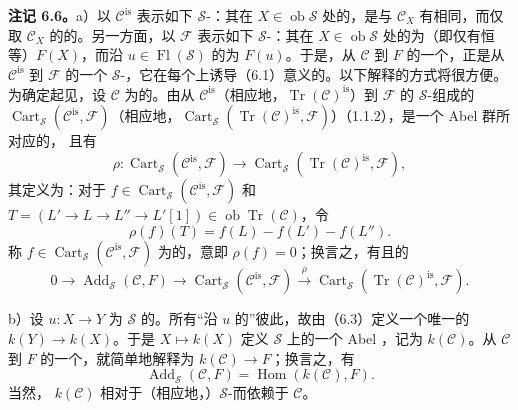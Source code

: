 \textbf{注记 6.6。}a）以 $\mathcal C^{\mathrm{is}}$ 表示如下 $\mathscr S$-：其在 $X\in\operatorname{ob}\mathscr S$ 处的，是与 $\mathcal C_X$ 有相同，而仅取 $\mathcal C_X$ 的的。另一方面，以 $\mathcal F$ 表示如下 $\mathscr S$-：其在 $X\in\operatorname{ob}\mathscr S$ 处的为（即仅有恒等）$F(X)$，而沿 $u\in\operatorname{Fl}(\mathscr S)$ 的为 $F(u)$。于是，从 $\mathcal C$ 到 $F$ 的一个，正是从 $\mathcal C^{\mathrm{is}}$ 到 $\mathcal F$ 的一个 $\mathscr S$-，它在每个上诱导（6.1）意义的。以下解释的方式将很方便。为确定起见，设 $\mathcal C$ 为的。由从 $\mathcal C^{\mathrm{is}}$（相应地，$\operatorname{Tr}(\mathcal C)^{\mathrm{is}}$）到 $\mathcal F$ 的 $\mathscr S$-组成的
$\operatorname{Cart}_{\mathscr S}(\mathcal C^{\mathrm{is}},\mathcal F)$（相应地，$\operatorname{Cart}_{\mathscr S}(\operatorname{Tr}(\mathcal C)^{\mathrm{is}},\mathcal F)$）（1.1.2），是一个 Abel 群所对应的，
且有
\[\rho:\operatorname{Cart}_{\mathscr S}(\mathcal C^{\mathrm{is}},\mathcal F)\longrightarrow\operatorname{Cart}_{\mathscr S}(\operatorname{Tr}(\mathcal C)^{\mathrm{is}},\mathcal F),\]
其定义为：对于 $f\in\operatorname{Cart}_{\mathscr S}(\mathcal C^{\mathrm{is}},\mathcal F)$ 和
$T=(L'\to L\to L''\to L'[1])\in\operatorname{ob}\operatorname{Tr}(\mathcal C)$，令
\[\rho(f)(T)=f(L)-f(L')-f(L'').\]
称 $f\in\operatorname{Cart}_{\mathscr S}(\mathcal C^{\mathrm{is}},\mathcal F)$ 为的，意即 $\rho(f)=0$；换言之，有且的
\[0\longrightarrow\operatorname{Add}_{\mathscr S}(\mathcal C,F)\longrightarrow\operatorname{Cart}_{\mathscr S}(\mathcal C^{\mathrm{is}},\mathcal F)\xrightarrow{\rho}\operatorname{Cart}_{\mathscr S}(\operatorname{Tr}(\mathcal C)^{\mathrm{is}},\mathcal F).\tag{6.6.1}\]

b）设 $u:X\to Y$ 为 $\mathscr S$ 的。所有“沿 $u$ 的”彼此，故由（6.3）定义一个唯一的 $k(Y)\to k(X)$。于是 $X\mapsto k(X)$ 定义 $\mathscr S$ 上的一个 Abel ，记为 $k(\mathcal C)$。从 $\mathcal C$ 到 $F$ 的一个，就简单地解释为 $k(\mathcal C)\to F$；换言之，有
\[\operatorname{Add}_{\mathscr S}(\mathcal C,F)=\operatorname{Hom}(k(\mathcal C),F).\]
当然， $k(\mathcal C)$ 相对于（相应地，）$\mathscr S$-而依赖于 $\mathcal C$。

